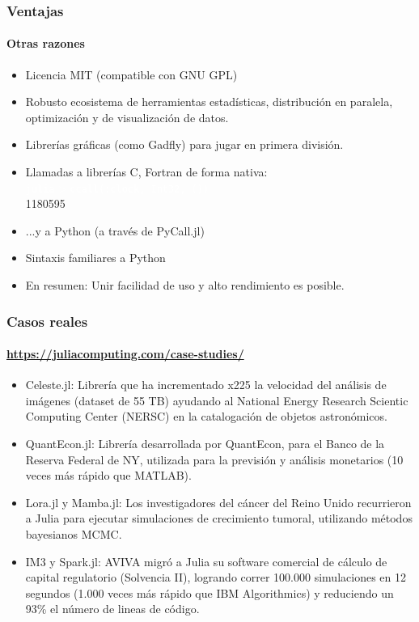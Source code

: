 \documentclass{beamer}
\providecommand{\comando}[1]{\texttt{\colorbox{morado_w}{\textcolor{white}{#1}}}}
\begin{document}
\begin{frame}
\frametitle{Ventajas}
\framesubtitle{Otras razones}
\begin{itemize}
	\item Licencia MIT (compatible con GNU GPL)
	\item Robusto ecosistema de herramientas estadísticas, distribución en paralela, optimización y de visualización de datos.
	\item Librerías gráficas (como Gadfly) para jugar en primera división.
	\item Llamadas a librerías C, Fortran de forma nativa:\\
	\comando{julia$>$ccall(:clock, Int32, ())}\\
	1180595\\
	\item ...y a Python (a través de PyCall.jl)
	\item Sintaxis familiares a Python
	\item En resumen: Unir facilidad de uso y alto rendimiento es posible.
\end{itemize}
\end{frame}

\begin{frame}
\frametitle{Casos reales}
\framesubtitle{\url{https://juliacomputing.com/case-studies/}}
\begin{itemize}
	\item Celeste.jl: Librería que ha incrementado x225 la velocidad del análisis de imágenes (dataset de 55 TB) ayudando al National Energy Research Scientic Computing Center (NERSC) en la catalogación de objetos astronómicos.
	\item QuantEcon.jl: Librería desarrollada por QuantEcon, para el Banco de la Reserva Federal de NY, utilizada para la previsión y análisis monetarios (10 veces más rápido que MATLAB).
	\item Lora.jl y Mamba.jl: Los investigadores del cáncer del Reino Unido recurrieron a Julia para ejecutar simulaciones de crecimiento tumoral, utilizando métodos bayesianos MCMC.
	\item IM3 y Spark.jl: AVIVA migró a Julia su software comercial de cálculo de capital regulatorio (Solvencia II), logrando correr 100.000 simulaciones en 12 segundos (1.000 veces más rápido que IBM Algorithmics) y reduciendo un 93\% el número de lineas de código.
\end{itemize}
\end{frame}
\end{document}
